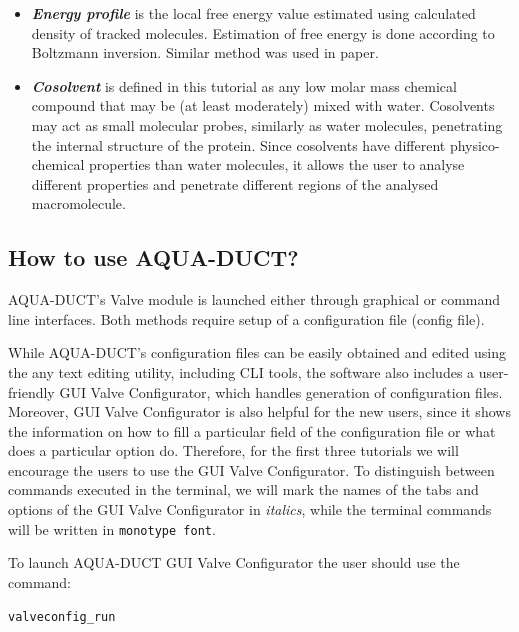 \documentclass[9pt,tutorial]{livecoms}
\begin{document}
\begin{itemize}
\item \textbf{\textit{Energy profile}} is the local free energy value estimated using calculated density of tracked molecules. Estimation of free energy is done according to Boltzmann inversion. Similar method was used in \cite{Rao2017} paper.
\item \textbf{\textit{Cosolvent}} is defined in this tutorial as any low molar mass chemical compound that may be (at least moderately) mixed with water. Cosolvents may act as small molecular probes, similarly as water molecules, penetrating the internal structure of the protein. Since cosolvents have different physico-chemical properties than water molecules, it allows the user to analyse different properties and penetrate different regions of the analysed macromolecule.
\end{itemize}

\subsection{How to use AQUA-DUCT?}

AQUA-DUCT's Valve module is launched either through graphical or command line interfaces. Both methods require setup of a configuration file (config file).

While AQUA-DUCT's configuration files can be easily obtained and edited using the any text editing utility, including CLI tools, the software also includes a user-friendly GUI Valve Configurator, which handles generation of configuration files. Moreover, GUI Valve Configurator is also helpful for the new users, since it shows the information on how to fill a particular field of the configuration file or what does a particular option do. Therefore, for the first three tutorials we will encourage the users to use the GUI Valve Configurator. To distinguish between commands executed in the terminal, we will mark the names of the tabs and options of the GUI Valve Configurator in \textit{italics}, while the terminal commands will be written in \texttt{monotype font}.

To launch AQUA-DUCT GUI Valve Configurator the user should use the command:
\begin{lstlisting}
valveconfig_run
\end{lstlisting}
\end{document}
